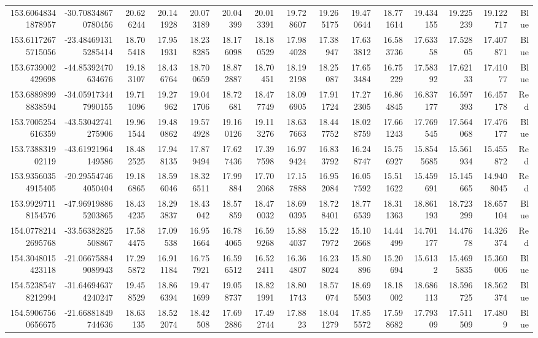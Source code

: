 \begin{center}
\begin{longtable}{rrrrrrrrrrrrrrr}
153.60648341878957 & -30.708348670780456 & 20.626244 & 20.141928 & 20.073189 & 20.04399 & 20.013391 & 19.728607 & 19.265175 & 19.470644 & 18.771614 & 19.434155 & 19.225239 & 19.122717 & Blue \\
153.61172675715056 & -23.484691315285414 & 18.705418 & 17.951931 & 18.238285 & 18.176098 & 18.180529 & 17.984028 & 17.38947 & 17.633812 & 16.583736 & 17.63358 & 17.52805 & 17.407871 & Blue \\
153.6739002429698 & -44.85392470634676 & 19.183107 & 18.436764 & 18.700659 & 18.872887 & 18.70451 & 18.192198 & 18.25087 & 17.653484 & 16.75229 & 17.58392 & 17.62133 & 17.41077 & Blue \\
153.68898998838594 & -34.059173447990155 & 19.711096 & 19.27962 & 19.041706 & 18.72681 & 18.477749 & 18.096905 & 17.911724 & 17.272305 & 16.864845 & 16.837177 & 16.597393 & 16.457178 & Red \\
153.7005254616359 & -43.53042741275906 & 19.961544 & 19.480862 & 19.574928 & 19.160126 & 19.113276 & 18.637663 & 18.447752 & 18.028759 & 17.661243 & 17.769545 & 17.564068 & 17.476177 & Blue \\
153.738831902119 & -43.61921964149586 & 18.482525 & 17.948135 & 17.879494 & 17.627436 & 17.397598 & 16.979424 & 16.833792 & 16.248747 & 15.756927 & 15.8545685 & 15.561934 & 15.455872 & Red \\
153.93560354915405 & -20.295547464050404 & 19.186865 & 18.596046 & 18.326511 & 17.99884 & 17.702068 & 17.157888 & 16.952084 & 16.057592 & 15.511622 & 15.459691 & 15.145665 & 14.9408045 & Red \\
153.99297118154576 & -47.969198865203865 & 18.434235 & 18.293837 & 18.43042 & 18.57859 & 18.470032 & 18.690395 & 18.728401 & 18.776539 & 18.311363 & 18.861193 & 18.723299 & 18.657104 & Blue \\
154.07782142695768 & -33.56382825508867 & 17.584475 & 17.09538 & 16.951664 & 16.784065 & 16.599268 & 15.884037 & 15.227972 & 15.102668 & 14.44499 & 14.701177 & 14.47678 & 14.326374 & Red \\
154.3048015423118 & -21.066758849089943 & 17.295872 & 16.911184 & 16.757921 & 16.596512 & 16.522411 & 16.364807 & 16.238024 & 15.80896 & 15.20694 & 15.6132 & 15.4695835 & 15.360006 & Blue \\
154.52385478212994 & -31.646946374240247 & 19.458529 & 18.866394 & 19.471699 & 19.058737 & 18.821991 & 18.801743 & 18.57074 & 18.695503 & 18.18002 & 18.686113 & 18.596725 & 18.562374 & Blue \\
154.59067560656675 & -21.66881849744636 & 18.63135 & 18.522074 & 18.42508 & 17.692886 & 17.492744 & 17.8823 & 18.041279 & 17.855572 & 17.598682 & 17.79309 & 17.511509 & 17.4809 & Blue \\

\end{longtable}
\end{center}
